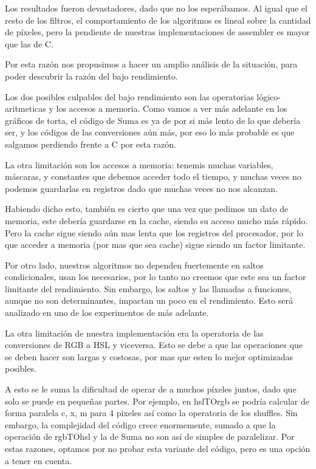 Los resultados fueron devastadores, dado que no los esperábamos. Al igual que el resto de los filtros, el comportamiento de los algoritmos es lineal sobre la cantidad de píxeles, pero la pendiente de nuestras implementaciones de assembler es mayor que las de C.

Por esta razón nos propusimos a hacer un amplio análisis de la situación, para poder descubrir la razón del bajo rendimiento.

Los dos posibles culpables del bajo rendimiento son las operatorias lógico-aritmeticas y los accesos a memoria.  Como vamos a ver más adelante en los gráficos de torta, el código de Suma es ya de por si más lento de lo que debería ser, y los códigos de las conversiones aún más, por eso lo más probable es que salgamos perdiendo frente a C por esta razón.

La otra limitación son los accesos a memoria: tenemis muchas variables, máscaras, y constantes que debemos acceder todo el tiempo, y muchas veces no podemos guardarlas en registros dado que muchas veces no nos alcanzan.

Habiendo dicho esto, también es cierto que una vez que pedimos un dato de memoria, este debería guardarse en la cache, siendo su acceso mucho más rápido. Pero la cache sigue siendo aún mas lenta que los registros del procesador, por lo que acceder a memoria (por mas que sea cache) sigue siendo un factor limitante.

Por otro lado, nuestros algoritmos no dependen fuertemente en saltos condicionales, usan los necesarios, por lo tanto no creemos que este sea un factor limitante del rendimiento. Sin embargo, los saltos y las llamadas a funciones, aunque no son determinantes, impactan un poco en el rendimiento. Esto será analizado en uno de los experimentos de más adelante.


La otra limitación de nuestra implementación era la operatoria de las conversiones de RGB a HSL y viceversa. Esto se debe a que las operaciones que se deben hacer son largas y costosas, por mas que esten lo mejor optimizadas posibles.

A esto se le suma la dificultad de operar de a muchos píxeles juntos, dado que solo se puede en pequeñas partes.
Por ejemplo, en hslTOrgb se podría calcular de forma paralela c, x, m para 4 pixeles así como la operatoria de los shuffles.
Sin embargo, la complejidad del código crece enormemente, sumado a que la operación de rgbTOhsl y la de Suma no son así de simples de paralelizar.
Por estas razones, optamos por no probar esta variante del código, pero es una opción a tener en cuenta. \\

